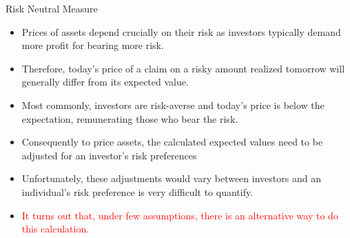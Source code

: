 \documentclass{beamer}
\begin{document}

\begin{frame}{Risk Neutral Measure}
	\begin{itemize}
	\item<1-> Prices of assets depend crucially on their risk as investors typically demand more profit for bearing more risk.
        \item<2-> Therefore, today's price of a claim on a risky amount realized tomorrow will generally differ from its expected value.
        \item<2-> Most commonly, investors are risk-averse and today's price is below the expectation, remunerating those who bear the risk.
	\item<4-> Consequently to price assets, the calculated expected values need to be adjusted for an investor's risk preferences
        \item<5-> Unfortunately, these adjustments would vary between investors and an individual's risk preference is very difficult to quantify.
	\item<6-> \textcolor{red}{It turns out that, under few assumptions, there is an alternative way to do this calculation.}
	\end{itemize}
\end{frame}
\end{document}
